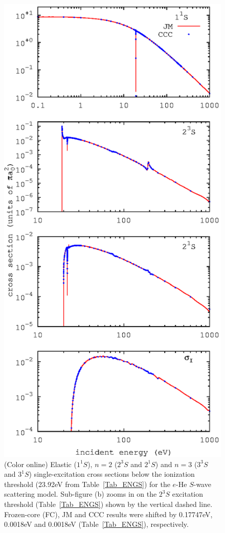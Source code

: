\documentclass[aip
, pra
, showpacs
, aps
, twocolumn
, groupedaddress
, floatfix
]{revtex4}
\begin{document}
\begin{figure}[htb]
\includegraphics[scale=1]{fig1.ps}
\caption{(Color online) Elastic ($1^1S$),
$n=2$ ($2^3S$ and $2^1S$) and $n=3$ ($3^3S$ and $3^1S$) single-excitation cross sections  below the ionization threshold (23.92eV from Table~\ref{Tab_ENGS}) for the $e$-He $S$-wave scattering model.
Sub-figure (b) zooms in on the $2^3S$ excitation threshold (Table~\ref{Tab_ENGS}) shown by the vertical dashed line.
Frozen-core (FC), JM and CCC results  were shifted by 0.17747eV, 0.0018eV and 0.0018eV (Table~\ref{Tab_ENGS}), respectively.
}
\label{Fig_1}
\end{figure}
\end{document}
